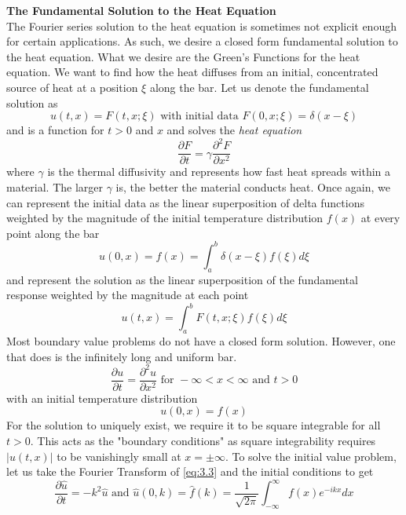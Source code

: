 \documentclass{article}
\newcommand{\pd}[2]{\frac{\partial #1}{\partial #2}}
\newcommand{\pdt}[2]{\frac{\partial ^2 #1}{\partial #2 ^2}}
\numberwithin{equation}{section}
\begin{document}
\textbf{The Fundamental Solution to the Heat Equation} \\
The Fourier series solution to the heat equation is sometimes not explicit enough for certain applications. As such, we desire a closed form fundamental solution to the heat equation. What we desire are the Green's Functions for the heat equation. We want to find how the heat diffuses from an initial, concentrated source of heat at a position $\xi$ along the bar. Let us denote the fundamental solution as 
\begin{equation}
    u(t,x) = F(t,x;\xi) \text{ with initial data } F(0,x;\xi) = \delta(x-\xi)
\end{equation}
and is a function for $t>0$ and $x$ and solves the \textit{heat equation} 
\begin{equation}
    \pd{F}{t} = \gamma \pdt{F}{x} \label{eq:heat}
\end{equation}
where $\gamma$ is the thermal diffusivity and represents how fast heat spreads within a material. The larger $\gamma$ is, the better the material conducts heat. Once again, we can represent the initial data as the linear superposition of delta functions weighted by the magnitude of the initial temperature distribution $f(x)$ at every point along the bar
\begin{equation*}
    u(0,x) = f(x) =\int^b_a \delta(x-\xi) f(\xi)d\xi
\end{equation*}
and represent the solution as the linear superposition of the fundamental response weighted by the magnitude at each point
\begin{equation*}
    u(t,x) = \int^b_aF(t,x;\xi)f(\xi)d\xi
\end{equation*}
Most boundary value problems do not have a closed form solution. However, one that does is the infinitely long and uniform bar.
\begin{equation}
    \pd{u}{t} = \pdt{u}{x} \text{ for } -\infty<x<\infty \text{ and } t>0 \label{eq:3.3}
\end{equation}
with an initial temperature distribution 
\begin{equation*}
    u(0,x) = f(x)
\end{equation*}
For the solution to uniquely exist, we require it to be square integrable for all $t>0$. This acts as the "boundary conditions" as square integrability requires $|u(t,x)|$ to be vanishingly small at $x=\pm \infty$. To solve the initial value problem, let us take the Fourier Transform of \eqref{eq:3.3} and the initial conditions to get 
\begin{equation}
    \pd{\hat{u}}{t} =-k^2\hat{u} \text{ and } \hat{u}(0,k) =\hat{f}(k) = \frac{1}{\sqrt{2\pi}}\int^\infty_{-\infty} f(x)e^{-ikx}dx \label{eq:3.4}
\end{equation}
\end{document}
